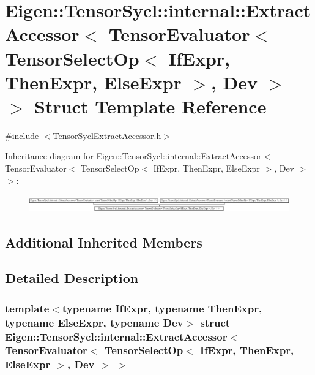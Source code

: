 \hypertarget{struct_eigen_1_1_tensor_sycl_1_1internal_1_1_extract_accessor_3_01_tensor_evaluator_3_01_tensor_c1f5d2f449cf83173b088e3d5d3e3227}{}\section{Eigen\+:\+:Tensor\+Sycl\+:\+:internal\+:\+:Extract\+Accessor$<$ Tensor\+Evaluator$<$ Tensor\+Select\+Op$<$ If\+Expr, Then\+Expr, Else\+Expr $>$, Dev $>$ $>$ Struct Template Reference}
\label{struct_eigen_1_1_tensor_sycl_1_1internal_1_1_extract_accessor_3_01_tensor_evaluator_3_01_tensor_c1f5d2f449cf83173b088e3d5d3e3227}


{\ttfamily \#include $<$Tensor\+Sycl\+Extract\+Accessor.\+h$>$}

Inheritance diagram for Eigen\+:\+:Tensor\+Sycl\+:\+:internal\+:\+:Extract\+Accessor$<$ Tensor\+Evaluator$<$ Tensor\+Select\+Op$<$ If\+Expr, Then\+Expr, Else\+Expr $>$, Dev $>$ $>$\+:\begin{figure}[H]
\begin{center}
\leavevmode
\includegraphics[height=0.749665cm]{struct_eigen_1_1_tensor_sycl_1_1internal_1_1_extract_accessor_3_01_tensor_evaluator_3_01_tensor_c1f5d2f449cf83173b088e3d5d3e3227}
\end{center}
\end{figure}
\subsection*{Additional Inherited Members}


\subsection{Detailed Description}
\subsubsection*{template$<$typename If\+Expr, typename Then\+Expr, typename Else\+Expr, typename Dev$>$\newline
struct Eigen\+::\+Tensor\+Sycl\+::internal\+::\+Extract\+Accessor$<$ Tensor\+Evaluator$<$ Tensor\+Select\+Op$<$ If\+Expr, Then\+Expr, Else\+Expr $>$, Dev $>$ $>$}


